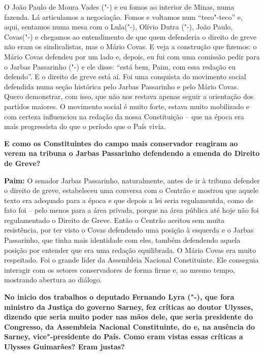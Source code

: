 O João Paulo de Moura Vades ("-) e eu fomos ao interior de Minas,
numa fazenda. Lá articulamos a negociação. Fomos e voltamos num
``teco"-teco'' e, aqui, sentamos numa mesa com o Lula("-), Olívio
Dutra ("-), João Paulo, Covas("-) e chegamos ao entendimento de
que quem defenderia o direito de greve não eram os sindicalistas, mas o
Mário Covas. E veja a construção que fizemos: o Mário Covas defendeu por
um lado e, depois, eu fui com uma comissão pedir para o Jarbas
Passarinho ("-) e ele disse: ``está bem, Paim, com essa redação eu
defendo''. E o direito de greve está aí. Foi uma conquista do movimento
social defendida numa seção histórica pelo Jarbas Passarinho e pelo
Mário Covas. Quero demonstrar, com isso, que não nos restava apenas
seguir a orientação dos partidos maiores. O movimento social é muito
forte, estava muito mobilizado e com certeza influenciou na redação da
nossa Constituição -- que na época era mais progressista do que o
período que o País vivia.

\textbf{E como os Constituintes do campo mais conservador reagiram ao
verem na tribuna o Jarbas Passarinho defendendo a emenda do Direito de
Greve?}

\textbf{Paim:} O senador Jarbas Passarinho, naturalmente, antes de ir à
tribuna defender o direito de greve, estabeleceu uma conversa com o
Centrão e mostrou que aquele texto era adequado para a época e que
depois a lei seria regulamentda, como de fato foi -- pelo menos para a
área privada, porque na área pública até hoje não foi regulamentado o
Direito de Greve. Então o Centrão aceitou sem muita resistência, por ter
visto o Covas defendendo uma posição à esquerda e o Jarbas Passarinho,
que tinha mais identidade com eles, também defendendo aquela posição por
entender que era uma redação equilibrada. O Mário Covas era muito
respeitado. Foi o grande líder da Assembleia Nacional Constituinte. Ele
conseguia interagir com os setores conservadores de forma firme e, ao
mesmo tempo, mostrando abertura ao diálogo.

\textbf{No inicio dos trabalhos o deputado Fernando Lyra ("-), que
fora ministro da Justiça do governo Sarney, fez críticas ao doutor
Ulysses, dizendo que seria muito poder nas mãos dele, que seria
presidente do Congresso, da Assembleia Nacional Constituinte, do  e,
na ausência do Sarney, vice"-presidente do País. Como eram vistas essas
críticas a Ulysses Guimarães? Eram justas?}

